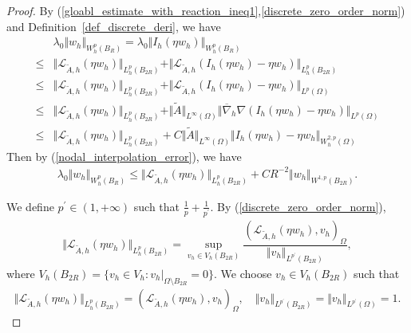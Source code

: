 \documentclass[12pt]{amsart}
\theoremstyle{definition}
\theoremstyle{remark}
\begin{document}
\begin{proof}
By (\ref{gloabl_estimate_with_reaction_ineq1},\ref{discrete_zero_order_norm}) 
and Definition~\ref{def_discrete_deri}, we have 
\begin{align*}
& \lambda_{0}\Vert w_{h} \Vert_{W_{h}^{p}(B_{R})}  
= \lambda_{0}\Vert I_{h}(\eta w_{h}) \Vert_{W_{h}^{p}(B_{R})} \\
\leq & \Vert \mathcal{L}_{\tilde{A},h}(\eta w_{h}) \Vert_{L_{h}^{p}(B_{2R})} 
+ \Vert \mathcal{L}_{\tilde{A},h}(I_{h}(\eta w_{h})-\eta w_{h}) \Vert_{L_{h}^{p}(B_{2R})} \\
\leq & \Vert \mathcal{L}_{\tilde{A},h}(\eta w_{h}) \Vert_{L_{h}^{p}(B_{2R})} 
+ \Vert \mathcal{L}_{\tilde{A},h}(I_{h}(\eta w_{h})-\eta w_{h}) \Vert_{L^{p}(\Omega)} \\
\leq & \Vert \mathcal{L}_{\tilde{A},h}(\eta w_{h}) \Vert_{L_{h}^{p}(B_{2R})} 
+ \Vert \tilde{A} \Vert_{L^{\infty}(\Omega)}\Vert \overline{\nabla}_{h}\nabla 
(I_{h}(\eta w_{h})-\eta w_{h})\Vert_{L^{p}(\Omega)} \\
\leq & \Vert \mathcal{L}_{\tilde{A},h}(\eta w_{h}) \Vert_{L_{h}^{p}(B_{2R})} 
+ C\Vert \tilde{A} \Vert_{L^{\infty}(\Omega)}\Vert I_{h}(\eta w_{h})-\eta w_{h}\Vert_{W_{h}^{2,p}(\Omega)}
\end{align*}
Then by (\ref{nodal_interpolation_error}), we have 
\begin{align}
\label{gloabl_estimate_with_reaction_ineq2}
\lambda_{0}\Vert w_{h} \Vert_{W_{h}^{p}(B_{R})} 
\leq \Vert \mathcal{L}_{\tilde{A},h}(\eta w_{h}) \Vert_{L_{h}^{p}(B_{2R})} 
+ C R^{-2}\Vert w_{h}\Vert_{W^{1,p}(B_{2R})}.
\end{align}

We define $p^{\prime} \in (1, + \infty)$ such that $\frac{1}{p} + \frac{1}{p^{\prime}}$. 
By (\ref{discrete_zero_order_norm}), 
\begin{align*}
\Vert \mathcal{L}_{\tilde{A},h}(\eta w_{h}) \Vert_{L_{h}^{p}(B_{2R})} 
= \sup_{v_{h} \in V_{h}(B_{2R})} \dfrac{(\mathcal{L}_{\tilde{A},h}(\eta w_{h}), v_{h})_{\Omega}}
{\Vert v_{h}\Vert_{L^{p^{\prime}}(B_{2R})}},
\end{align*}
where $V_{h}(B_{2R}) = \{ v_{h} \in V_{h} : v_{h}|_{\Omega \setminus B_{2R}} = 0 \}$. 
We choose $v_{h} \in V_{h}(B_{2R})$ such that 
\begin{align}
\label{local_norm_variable_A}
\Vert \mathcal{L}_{\tilde{A},h}(\eta w_{h}) \Vert_{L_{h}^{p}(B_{2R})} 
= (\mathcal{L}_{\tilde{A},h}(\eta w_{h}), v_{h})_{\Omega}, \quad 
\Vert v_{h}\Vert_{L^{p^{\prime}}(B_{2R})} = \Vert v_{h}\Vert_{L^{p^{\prime}}(\Omega)} = 1.
\end{align}


\end{proof}
\end{document}
